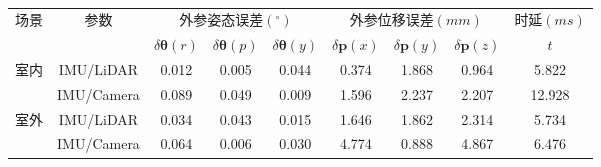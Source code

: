 \begin{table}[]
  \centering
  \caption{}
  \label{tab:real_world_statistic}
  \normf
  \begin{tabular}{c|c|ccccccc}
    \hline
    \multirow{2}{*}{场景} & \multirow{2}{*}{参数} & \multicolumn{3}{c|}{外参姿态误差$(^\circ)$} & \multicolumn{3}{c|}{外参位移误差$(mm)$} & 时延$(ms)$                                                                                                                                                                    \\ \cline{3-9}
                          &                       & $\delta{\boldsymbol{\theta}(r)}$            & $\delta{\boldsymbol{\theta}(p)}$        & \multicolumn{1}{c|}{$\delta{\boldsymbol{\theta}(y)}$} & $\delta{\boldsymbol{p}(x)}$ & $\delta{\boldsymbol{p}(y)}$ & \multicolumn{1}{c|}{$\delta{\boldsymbol{p}(z)}$} & $ t$   \\ \hline
    \multirow{2}{*}{室内} & IMU/LiDAR             & 0.012                                       & 0.005                                   & 0.044                                                 & 0.374                       & 1.868                       & 0.964                                            & 5.822  \\
                          & IMU/Camera            & 0.089                                       & 0.049                                   & 0.009                                                 & 1.596                       & 2.237                       & 2.207                                            & 12.928 \\ \hline
    \multirow{2}{*}{室外} & IMU/LiDAR             & 0.034                                       & 0.043                                   & 0.015                                                 & 1.646                       & 1.862                       & 2.314                                            & 5.734  \\
                          & IMU/Camera            & 0.064                                       & 0.006                                   & 0.030                                                 & 4.774                       & 0.888                       & 4.867                                            & 6.476  \\ \hline
  \end{tabular}
\end{table}

